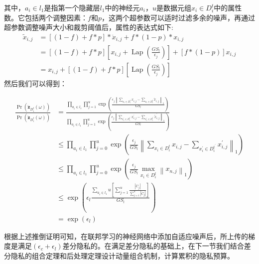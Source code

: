 其中，$a_{i} \in l_{1}$是指第一个隐藏层$l_{1}$中的神经元$a_{i}$，$u$是数据元组$x_{i} \in D_{i}^{t}$中的属性数。它包括两个调整因素：$f$和$p$，这两个超参数可以适时过滤多余的噪声，再通过超参数调整噪声大小和裁剪阈值后，属性的表达式如下:
\begin{equation}
\begin{aligned}
\tilde{x}_{i, j} &=[(1-f)+f * p] * \ddot{x}_{i, j}+f *(1-p) * x_{i, j} \\
&=[(1-f)+f * p]\left[x_{i, j}+\operatorname{Lap}\left(\frac{G S_{l}}{\epsilon_{j}}\right)\right]+[f *(1-p)] x_{i, j} \\
&=x_{i, j}+[(1-f)+f * p]\left[\operatorname{Lap}\left(\frac{G S_{l}}{\epsilon_{j}}\right)\right]
\end{aligned}
\end{equation}
然后我们可以得到：

\begin{equation}
\begin{aligned}
\frac{\operatorname{Pr}\left(\ddot{\mathbf{z}}_{D_{i}^{t}}(\omega)\right)}{\operatorname{Pr}\left(\ddot{\mathbf{z}}_{D_{i}^{t}}(\omega)\right)} &=\frac{\prod_{a_{i} \in l_{1}} \prod_{j=1}^{u} \exp \left(\frac{\epsilon_{j}\left\|\sum_{x_{i} \in D_{i}^{t}} x_{i, j}-\sum_{x_{i} \in D_{i}^{t}} \tilde{x}_{i, j}\right\|_{1}}{G S_{l}}\right)}{\prod_{a_{i} \in l_{1}} \prod_{j=1}^{u} \exp \left(\frac{\epsilon_{j}\left\|\sum_{x_{i}^{\prime} \in D_{i}^{t^{\prime}}} x_{i, j}^{\prime}-\sum_{x_{i}^{\prime} \in D_{i}^{t^{\prime}}} \tilde{x}_{i, j}^{\prime}\right\|_{1}}{G S_{l}}\right)} \\
& \leq \prod_{a_{i} \in l_{1}} \prod_{j=0}^{u} \exp \left(\frac{\epsilon_{j}}{G S_{l}}\left\|\sum_{x_{i} \in D_{i}^{t}} x_{i, j}-\sum_{x_{i}^{\prime} \in D_{i}^{t^{\prime}}} x_{i, j}^{\prime}\right\|_{1}\right) \\
& \leq \prod_{a_{i} \in l_{1}} \prod_{j=0}^{u} \exp \left(\frac{\epsilon_{j}}{G S_{l}} \max _{x_{i} \in D_{i}^{t}}\left\|x_{n, j}\right\|_{1}\right) \\
& \leq \exp \left(\epsilon_{l} \frac{\sum_{a_{i} \in l_{1}} u\left[\sum_{j=1}^{u} \frac{\left|\ddot{C}_{j}\right|}{\sum_{j=1}^{u}\left|\ddot{C}_{j}\right|}\right]}{G S_{l}}\right) \\
&=\exp \left(\epsilon_{l}\right)
\end{aligned}
\end{equation}

根据上述推倒证明可知，在联邦学习的神经网络中添加自适应噪声后，所上传的梯度是满足$\left(\epsilon_{c}+\epsilon_{l}\right)$差分隐私的。在满足差分隐私的基础上，在下一节我们结合差分隐私的组合定理和后处理定理设计动量组合机制，计算累积的隐私预算。

